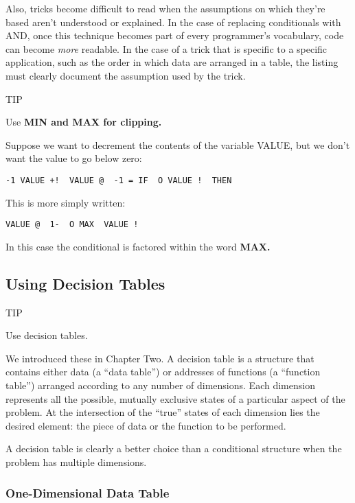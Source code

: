 Also, tricks become difficult to read when the assumptions on which
they're based aren't understood or explained. In the case of replacing
conditionals with AND, once this technique becomes part of every
programmer's vocabulary, code can become \emph{more} readable. In the case of
a trick that is specific to a specific application, such as the order in which
data are arranged in a table, the listing must clearly document the
assumption used by the trick.

TIP

Use \bf{MIN} and \bf{MAX} for clipping.

Suppose we want to decrement the contents of the variable VALUE, but
we don't want the value to go below zero:

\begin{verbatim}
-1 VALUE +!  VALUE @  -1 = IF  O VALUE !  THEN
\end{verbatim}

This is more simply written:

\begin{verbatim}
VALUE @  1-  O MAX  VALUE !
\end{verbatim}

In this case the conditional is factored within the word \bf{MAX}.

\subsection{Using Decision Tables}

TIP

Use decision tables.

We introduced these in Chapter Two. A decision table is a structure that
contains either data (a ``data table'') or addresses of functions (a
``function table'') arranged according to any number of dimensions. Each
dimension represents all the possible, mutually exclusive states of a
particular aspect of the problem. At the intersection of the ``true'' states
of each dimension lies the desired element: the piece of data or the function
to be performed.

A decision table is clearly a better choice than a conditional structure
when the problem has multiple dimensions.

\subsubsection{One-Dimensional Data Table}

